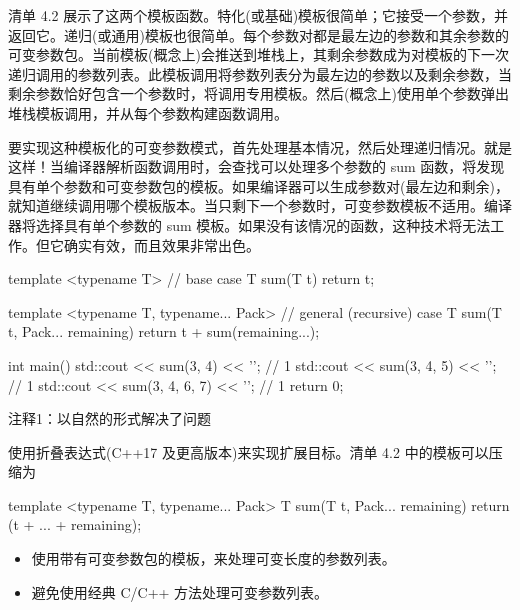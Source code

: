 清单 4.2 展示了这两个模板函数。特化(或基础)模板很简单；它接受一个参数，并返回它。递归(或通用)模板也很简单。每个参数对都是最左边的参数和其余参数的可变参数包。当前模板(概念上)会推送到堆栈上，其剩余参数成为对模板的下一次递归调用的参数列表。此模板调用将参数列表分为最左边的参数以及剩余参数，当剩余参数恰好包含一个参数时，将调用专用模板。然后(概念上)使用单个参数弹出堆栈模板调用，并从每个参数构建函数调用。

要实现这种模板化的可变参数模式，首先处理基本情况，然后处理递归情况。就是这样！当编译器解析函数调用时，会查找可以处理多个参数的 sum 函数，将发现具有单个参数和可变参数包的模板。如果编译器可以生成参数对(最左边和剩余)，就知道继续调用哪个模板版本。当只剩下一个参数时，可变参数模板不适用。编译器将选择具有单个参数的 sum 模板。如果没有该情况的函数，这种技术将无法工作。但它确实有效，而且效果非常出色。


\begin{cpp}
template <typename T> // base case
T sum(T t) { return t; }

template <typename T, typename... Pack> // general (recursive) case
T sum(T t, Pack... remaining) { return t + sum(remaining...); }

int main() {
  std::cout << sum(3, 4) << '\n'; // 1
  std::cout << sum(3, 4, 5) << '\n'; // 1
  std::cout << sum(3, 4, 6, 7) << '\n'; // 1
  return 0;
}
\end{cpp}

{\footnotesize
注释1：以自然的形式解决了问题
}

使用折叠表达式(C++17 及更高版本)来实现扩展目标。清单 4.2 中的模板可以压缩为

\begin{cpp}
template <typename T, typename... Pack>
T sum(T t, Pack... remaining) {
  return (t + ... + remaining);
}
\end{cpp}


\begin{itemize}
\item
使用带有可变参数包的模板，来处理可变长度的参数列表。

\item
避免使用经典 C/C++ 方法处理可变参数列表。
\end{itemize}
